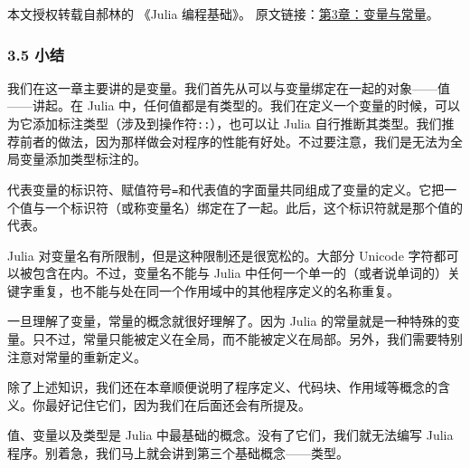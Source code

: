 
本文授权转载自郝林的 《Julia 编程基础》。 原文链接：\href{https://github.com/hyper0x/JuliaBasics/blob/master/book/ch03.md}{第3章：变量与常量}。


\subsubsection{3.5 小结}

我们在这一章主要讲的是变量。我们首先从可以与变量绑定在一起的对象——值——讲起。在 Julia 中，任何值都是有类型的。我们在定义一个变量的时候，可以为它添加标注类型（涉及到操作符\verb`::`），也可以让 Julia 自行推断其类型。我们推荐前者的做法，因为那样做会对程序的性能有好处。不过要注意，我们是无法为全局变量添加类型标注的。

代表变量的标识符、赋值符号\verb`=`和代表值的字面量共同组成了变量的定义。它把一个值与一个标识符（或称变量名）绑定在了一起。此后，这个标识符就是那个值的代表。

Julia 对变量名有所限制，但是这种限制还是很宽松的。大部分 Unicode 字符都可以被包含在内。不过，变量名不能与 Julia 中任何一个单一的（或者说单词的）关键字重复，也不能与处在同一个作用域中的其他程序定义的名称重复。

一旦理解了变量，常量的概念就很好理解了。因为 Julia 的常量就是一种特殊的变量。只不过，常量只能被定义在全局，而不能被定义在局部。另外，我们需要特别注意对常量的重新定义。

除了上述知识，我们还在本章顺便说明了程序定义、代码块、作用域等概念的含义。你最好记住它们，因为我们在后面还会有所提及。

值、变量以及类型是 Julia 中最基础的概念。没有了它们，我们就无法编写 Julia 程序。别着急，我们马上就会讲到第三个基础概念——类型。
